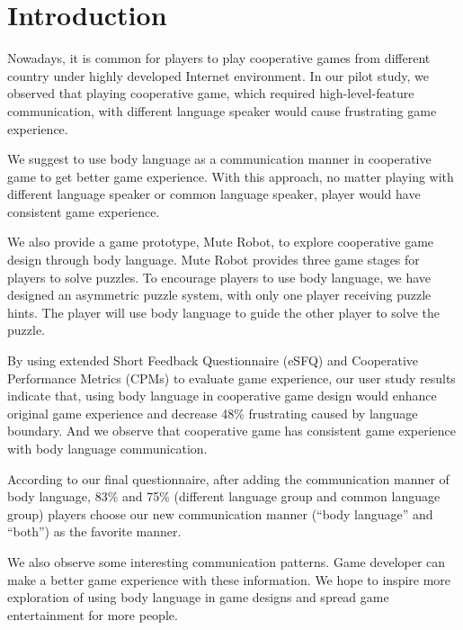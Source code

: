 \section{Introduction}

Nowadays, it is common for players to play cooperative games from different country under highly developed Internet environment. 
In our pilot study, we observed that playing cooperative game, which required high-level-feature communication, with different language speaker would cause frustrating game experience.

We suggest to use body language as a communication manner in cooperative game to get better game experience. With this approach, no matter playing with different language speaker or common language speaker, player would have consistent game experience. 

We also provide a game prototype, Mute Robot, to explore cooperative game design through body language. Mute Robot provides three game stages for players to solve puzzles.
To encourage players to use body language, we have designed an asymmetric puzzle system, with only one player receiving puzzle hints. The player will use body language to guide the other player to solve the puzzle.

By using extended Short Feedback Questionnaire (eSFQ)\cite{eSFQ} and Cooperative Performance Metrics (CPMs)\cite{CPMs} to evaluate game experience, our user study results indicate that, using body language in cooperative game design would enhance original game experience and decrease 48\% frustrating caused by language boundary. And we observe that cooperative game has consistent game experience with body language communication.

According to our final questionnaire, after adding the communication manner of body language, 83\% and 75\% (different language group and common language group) players choose our new communication manner (``body language'' and ``both'') as the favorite manner. 

We also observe some interesting communication patterns. Game developer can make a better game experience with these information. We hope to inspire more exploration of using body language in game designs and spread game entertainment for more people.


